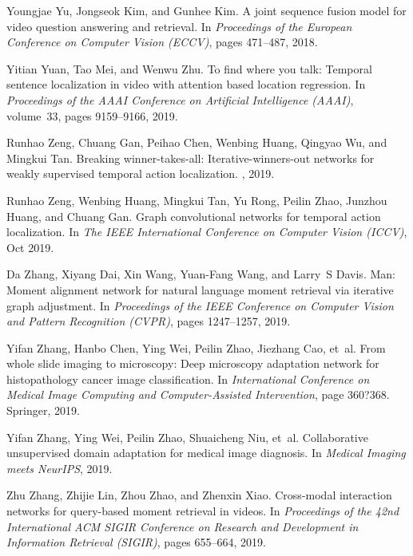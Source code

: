 \documentclass[10pt,twocolumn,letterpaper]{article}
\begin{document}
\begin{thebibliography}{10}
	Youngjae Yu, Jongseok Kim, and Gunhee Kim.
	\newblock A joint sequence fusion model for video question answering and
	retrieval.
	\newblock In {\em Proceedings of the European Conference on Computer Vision
		(ECCV)}, pages 471--487, 2018.
	
	Yitian Yuan, Tao Mei, and Wenwu Zhu.
	\newblock To find where you talk: Temporal sentence localization in video with
	attention based location regression.
	\newblock In {\em Proceedings of the AAAI Conference on Artificial Intelligence
		(AAAI)}, volume~33, pages 9159--9166, 2019.
	
	Runhao Zeng, Chuang Gan, Peihao Chen, Wenbing Huang, Qingyao Wu, and Mingkui
	Tan.
	\newblock Breaking winner-takes-all: Iterative-winners-out networks for weakly
	supervised temporal action localization.
	, 2019.
	
	Runhao Zeng, Wenbing Huang, Mingkui Tan, Yu Rong, Peilin Zhao, Junzhou Huang,
	and Chuang Gan.
	\newblock Graph convolutional networks for temporal action localization.
	\newblock In {\em The IEEE International Conference on Computer Vision (ICCV)},
	Oct 2019.
	
	Da Zhang, Xiyang Dai, Xin Wang, Yuan-Fang Wang, and Larry~S Davis.
	\newblock Man: Moment alignment network for natural language moment retrieval
	via iterative graph adjustment.
	\newblock In {\em Proceedings of the IEEE Conference on Computer Vision and
		Pattern Recognition (CVPR)}, pages 1247--1257, 2019.
	
	Yifan Zhang, Hanbo Chen, Ying Wei, Peilin Zhao, Jiezhang Cao, et~al.
	\newblock From whole slide imaging to microscopy: Deep microscopy adaptation
	network for histopathology cancer image classification.
	\newblock In {\em International Conference on Medical Image Computing and
		Computer-Assisted Intervention}, page 360?368. Springer, 2019.
	
	Yifan Zhang, Ying Wei, Peilin Zhao, Shuaicheng Niu, et~al.
	\newblock Collaborative unsupervised domain adaptation for medical image
	diagnosis.
	\newblock In {\em Medical Imaging meets NeurIPS}, 2019.
	
	Zhu Zhang, Zhijie Lin, Zhou Zhao, and Zhenxin Xiao.
	\newblock Cross-modal interaction networks for query-based moment retrieval in
	videos.
	\newblock In {\em Proceedings of the 42nd International {ACM} {SIGIR}
		Conference on Research and Development in Information Retrieval (SIGIR)},
	pages 655--664, 2019.
	

\end{thebibliography}
\end{document}

